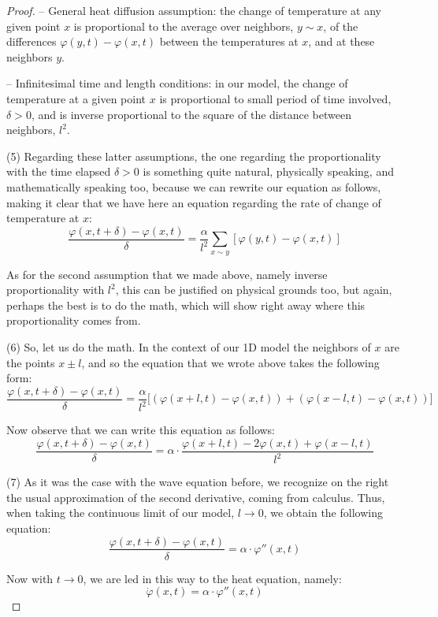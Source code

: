 \documentclass[12pt]{amsbook}
\begin{document}
\begin{proof}
\medskip

-- General heat diffusion assumption: the change of temperature at any given point $x$ is proportional to the average over neighbors, $y\sim x$, of the differences $\varphi(y,t)-\varphi(x,t)$ between the temperatures at $x$, and at these neighbors $y$.

\medskip

-- Infinitesimal time and length conditions: in our model, the change of temperature at a given point $x$ is proportional to small period of time involved, $\delta>0$, and is inverse proportional to the square of the distance between neighbors, $l^2$.

\medskip

(5) Regarding these latter assumptions, the one regarding the proportionality with the time elapsed $\delta>0$ is something quite natural, physically speaking, and mathematically speaking too, because we can rewrite our equation as follows, making it clear that we have here an equation regarding the rate of change of temperature at $x$:
$$\frac{\varphi(x,t+\delta)-\varphi(x,t)}{\delta}=\frac{\alpha}{l^2}\sum_{x\sim y}\left[\varphi(y,t)-\varphi(x,t)\right]$$

As for the second assumption that we made above, namely inverse proportionality with $l^2$, this can be justified on physical grounds too, but again, perhaps the best is to do the math, which will show right away where this proportionality comes from. 

\medskip

(6) So, let us do the math. In the context of our 1D model the neighbors of $x$ are the points $x\pm l$, and so the equation that we wrote above takes the following form:
$$\frac{\varphi(x,t+\delta)-\varphi(x,t)}{\delta}=\frac{\alpha}{l^2}\Big[(\varphi(x+l,t)-\varphi(x,t))+(\varphi(x-l,t)-\varphi(x,t))\Big]$$

Now observe that we can write this equation as follows:
$$\frac{\varphi(x,t+\delta)-\varphi(x,t)}{\delta}
=\alpha\cdot\frac{\varphi(x+l,t)-2\varphi(x,t)+\varphi(x-l,t)}{l^2}$$

(7) As it was the case with the wave equation before, we recognize on the right the usual approximation of the second derivative, coming from calculus. Thus, when taking the continuous limit of our model, $l\to 0$, we obtain the following equation:
$$\frac{\varphi(x,t+\delta)-\varphi(x,t)}{\delta}
=\alpha\cdot\varphi''(x,t)$$

Now with $t\to0$, we are led in this way to the heat equation, namely:
$$\dot{\varphi}(x,t)=\alpha\cdot\varphi''(x,t)$$


\end{proof}
\end{document}

